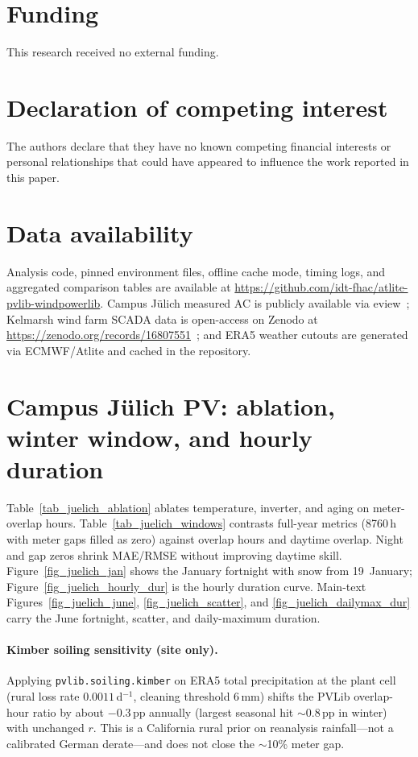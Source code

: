 \documentclass[preprint,12pt,number]{elsarticle}
\begin{document}
\section*{Funding}
This research received no external funding.

\section*{Declaration of competing interest}
The authors declare that they have no known competing financial interests or personal relationships that could have appeared to influence the work reported in this paper.

\section*{Data availability}
Analysis code, pinned environment files, offline cache mode, timing logs, and aggregated comparison tables are available at \url{https://github.com/idt-fhac/atlite-pvlib-windpowerlib}.
Campus Jülich measured AC is publicly available via eview~\citep{eviewJuelich}; Kelmarsh wind farm SCADA data is open-access on Zenodo at \url{https://zenodo.org/records/16807551}~\citep{KelmarshSCADA}; and ERA5 weather cutouts are generated via ECMWF/Atlite and cached in the repository.

\appendix
\section{Campus Jülich PV: ablation, winter window, and hourly duration}
\label{app:juelich}

Table~\ref{tab_juelich_ablation} ablates temperature, inverter, and aging on meter-overlap hours.
Table~\ref{tab_juelich_windows} contrasts full-year metrics (8760\,h with meter gaps filled as zero) against overlap hours and daytime overlap.
Night and gap zeros shrink MAE/RMSE without improving daytime skill.
Figure~\ref{fig_juelich_jan} shows the January fortnight with snow from 19~January; Figure~\ref{fig_juelich_hourly_dur} is the hourly duration curve.
Main-text Figures~\ref{fig_juelich_june}, \ref{fig_juelich_scatter}, and \ref{fig_juelich_dailymax_dur} carry the June fortnight, scatter, and daily-maximum duration.

\paragraph{Kimber soiling sensitivity (site only).}
Applying \texttt{pvlib.soiling.kimber} on ERA5 total precipitation at the plant cell (rural loss rate $0.0011$\,d$^{-1}$, cleaning threshold $6$\,mm) shifts the PVLib overlap-hour ratio by about $-0.3$\,pp annually (largest seasonal hit $\sim$0.8\,pp in winter) with unchanged $r$.
This is a California rural prior on reanalysis rainfall---not a calibrated German derate---and does not close the $\sim$10\% meter gap.
\end{document}
